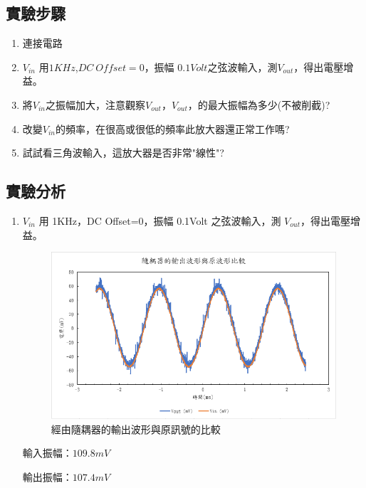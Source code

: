 \documentclass[12pt,a4paper]{article}
\begin{document}
\begin{CJK}{UTF8}{bkai}
\subsection{實驗步驟}
\begin{enumerate}
    \item 連接電路
    \item $V_{in}$ 用$1KHz$,$DC\ Offset=0$，振幅 $0.1Volt$之弦波輸入，測$V_{out}$，得出電壓增益。
    \item 將$V_{in}$之振幅加大，注意觀察$V_{out}$，$V_{out}$，的最大振幅為多少(不被削截)?
    \item 改變$V_{in}$的頻率，在很高或很低的頻率此放大器還正常工作嗎?
    \item 試試看三角波輸入，這放大器是否非常"線性"?
\end{enumerate}

\clearpage
\subsection{實驗分析}

\begin{enumerate}
    \item $V_{in}$ 用 1KHz，DC Offset=0，振幅 0.1Volt 之弦波輸入，測 $V_{out}$，得出電壓增益。


\begin{figure}[h]
    \centering
    \includegraphics[width=0.7\linewidth]{figures/Buffer amplifier/Buffer amplifier.png}
    \caption{經由隨耦器的輸出波形與原訊號的比較}
    \label{fig:BA_normal}
\end{figure}

輸入振幅：$109.8mV$

輸出振幅：$107.4mV$


\end{enumerate}
\end{CJK}
\end{document}
